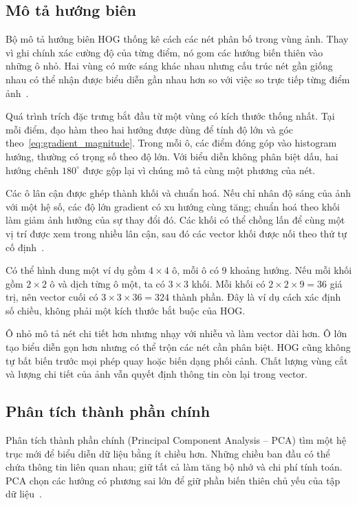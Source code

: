 \subsection{Mô tả hướng biên}
Bộ mô tả hướng biên HOG thống kê cách các nét phân bố trong vùng ảnh. Thay vì ghi chính xác cường độ của từng điểm, nó gom các hướng biến thiên vào những ô nhỏ. Hai vùng có mức sáng khác nhau nhưng cấu trúc nét gần giống nhau có thể nhận được biểu diễn gần nhau hơn so với việc so trực tiếp từng điểm ảnh~\cite{tailieu_bai5,dalal2005hog}.

Quá trình trích đặc trưng bắt đầu từ một vùng có kích thước thống nhất. Tại mỗi điểm, đạo hàm theo hai hướng được dùng để tính độ lớn và góc theo~\eqref{eq:gradient_magnitude}. Trong mỗi ô, các điểm đóng góp vào histogram hướng, thường có trọng số theo độ lớn. Với biểu diễn không phân biệt dấu, hai hướng chênh $180^\circ$ được gộp lại vì chúng mô tả cùng một phương của nét.

Các ô lân cận được ghép thành khối và chuẩn hoá. Nếu chỉ nhân độ sáng của ảnh với một hệ số, các độ lớn gradient có xu hướng cùng tăng; chuẩn hoá theo khối làm giảm ảnh hưởng của sự thay đổi đó. Các khối có thể chồng lấn để cùng một vị trí được xem trong nhiều lân cận, sau đó các vector khối được nối theo thứ tự cố định~\cite{skimage_hog}.

Có thể hình dung một ví dụ gồm $4\times4$ ô, mỗi ô có 9 khoảng hướng. Nếu mỗi khối gồm $2\times2$ ô và dịch từng ô một, ta có $3\times3$ khối. Mỗi khối có $2\times2\times9=36$ giá trị, nên vector cuối có $3\times3\times36=324$ thành phần. Đây là ví dụ cách xác định số chiều, không phải một kích thước bắt buộc của HOG.

Ô nhỏ mô tả nét chi tiết hơn nhưng nhạy với nhiễu và làm vector dài hơn. Ô lớn tạo biểu diễn gọn hơn nhưng có thể trộn các nét cần phân biệt. HOG cũng không tự bất biến trước mọi phép quay hoặc biến dạng phối cảnh. Chất lượng vùng cắt và lượng chi tiết của ảnh vẫn quyết định thông tin còn lại trong vector.

\subsection{Phân tích thành phần chính}
Phân tích thành phần chính (Principal Component Analysis -- PCA) tìm một hệ trục mới để biểu diễn dữ liệu bằng ít chiều hơn. Những chiều ban đầu có thể chứa thông tin liên quan nhau; giữ tất cả làm tăng bộ nhớ và chi phí tính toán. PCA chọn các hướng có phương sai lớn để giữ phần biến thiên chủ yếu của tập dữ liệu~\cite{tailieu_bai8}.

